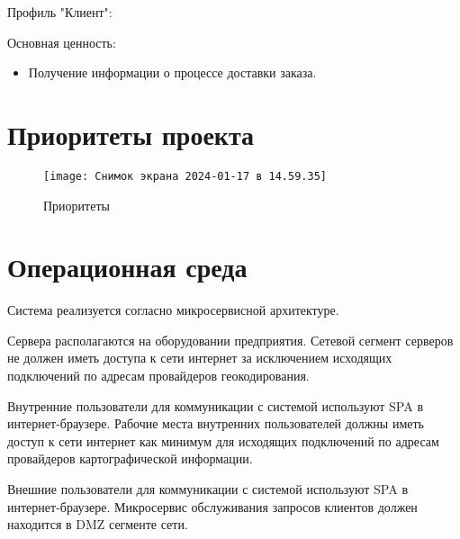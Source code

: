 Профиль "Клиент":

Основная ценность:
\begin{itemize}
    \item Получение информации о процессе доставки заказа.
\end{itemize}


\section{Приоритеты проекта}
\label{sec:priorities}

\begin{figure}[H]
    \centering
    \texttt{[image: Снимок экрана 2024-01-17 в 14.59.35]}
    \caption{Приоритеты}
    \label{fig:}
\end{figure}


\section{Операционная среда}
\label{sec:env}

Система реализуется согласно микросервисной архитектуре.

Сервера располагаются на оборудовании предприятия.
Сетевой сегмент серверов не должен иметь доступа к сети интернет за исключением исходящих подключений по адресам провайдеров геокодирования.

Внутренние пользователи для коммуникации с системой используют SPA в интернет-браузере.
Рабочие места внутренних пользователей должны иметь доступ к сети интернет как минимум для исходящих подключений по адресам провайдеров картографической информации.

Внешние пользователи для коммуникации с системой используют SPA в интернет-браузере.
Микросервис обслуживания запросов клиентов должен находится в DMZ сегменте сети.

\endinput
